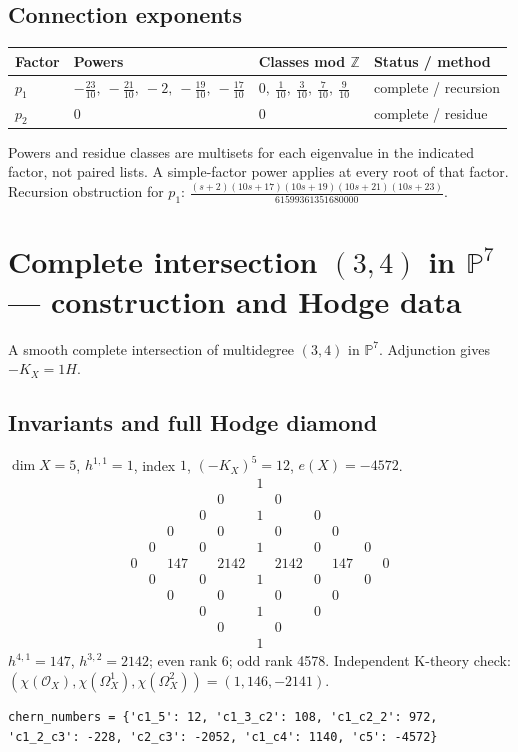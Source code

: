 \documentclass[10pt,a4paper]{article}
\begin{document}
\subsection*{Connection exponents}
\begin{center}\begin{tabular}{llll}\toprule Factor & Powers & Classes mod $\mathbb Z$ & Status / method\\\midrule
$p_{1}$ & $- \frac{23}{10},\ - \frac{21}{10},\ -2,\ - \frac{19}{10},\ - \frac{17}{10}$ & $0,\ \frac{1}{10},\ \frac{3}{10},\ \frac{7}{10},\ \frac{9}{10}$ & complete / recursion\\
$p_{2}$ & $0$ & $0$ & complete / residue\\
\bottomrule\end{tabular}\end{center}
Powers and residue classes are multisets for each eigenvalue in the indicated factor, not paired lists. A simple-factor power applies at every root of that factor.
Recursion obstruction for $p_{1}$: $\frac{\left(s + 2\right) \left(10 s + 17\right) \left(10 s + 19\right) \left(10 s + 21\right) \left(10 s + 23\right)}{61599361351680000}$.
\clearpage\section*{Complete intersection $(3,4)$ in $\mathbb P^{7}$ --- construction and Hodge data}\label{entry:PCI5-3-4}
A smooth complete intersection of multidegree $(3,4)$ in $\mathbb P^{7}$.
Adjunction gives $-K_X=1H$.
\subsection*{Invariants and full Hodge diamond}
$\dim X=5$, $h^{1,1}=1$, index $1$, $(-K_X)^5=12$, $e(X)=-4572$.
\[\begin{array}{ccccccccccc}&&&&&1&&&&&\\&&&&0&&0&&&&\\&&&0&&1&&0&&&\\&&0&&0&&0&&0&&\\&0&&0&&1&&0&&0&\\0&&147&&2142&&2142&&147&&0\\&0&&0&&1&&0&&0&\\&&0&&0&&0&&0&&\\&&&0&&1&&0&&&\\&&&&0&&0&&&&\\&&&&&1&&&&&\end{array}\]
$h^{4,1}=147$, $h^{3,2}=2142$; even rank 6; odd rank 4578.
Independent K-theory check: $(\chi(\mathcal O_X),\chi(\Omega_X^1),\chi(\Omega_X^2))=(1, 146, -2141)$.
\begin{lstlisting}
chern_numbers = {'c1_5': 12, 'c1_3_c2': 108, 'c1_c2_2': 972, 'c1_2_c3': -228, 'c2_c3': -2052, 'c1_c4': 1140, 'c5': -4572}
\end{lstlisting}
\end{document}
